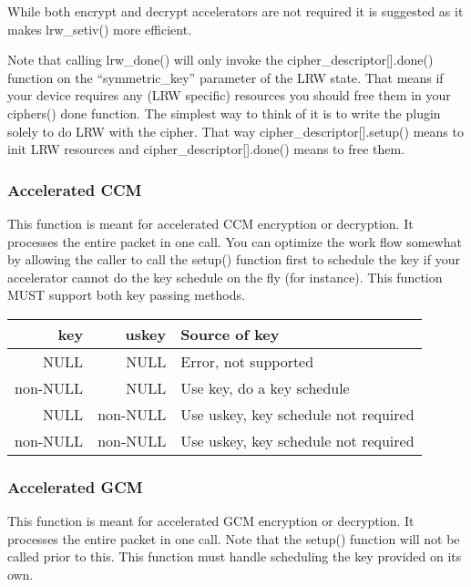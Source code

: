 \documentclass[a4paper]{book}
\begin{document}
While both encrypt and decrypt accelerators are not required it is suggested as it makes lrw\_setiv() more efficient.

Note that calling lrw\_done() will only invoke the cipher\_descriptor[].done() function on the ``symmetric\_key'' parameter of the LRW state.  That means 
if your device requires any (LRW specific) resources you should free them in your ciphers() done function.  The simplest way to think of it is to write
the plugin solely to do LRW with the cipher.  That way cipher\_descriptor[].setup() means to init LRW resources and cipher\_descriptor[].done() means to
free them.

\subsubsection{Accelerated CCM}
This function is meant for accelerated CCM encryption or decryption.  It processes the entire packet in one call.  You can optimize the work flow somewhat
by allowing the caller to call the setup() function first to schedule the key if your accelerator cannot do the key schedule on the fly (for instance).  This 
function MUST support both key passing methods.

\begin{center}
\begin{small}
\begin{tabular}{|r|r|l|}
\hline \textbf{key} & \textbf{uskey} & \textbf{Source of key} \\
\hline NULL         & NULL           & Error, not supported \\
\hline non-NULL     & NULL           & Use key, do a key schedule \\
\hline NULL         & non-NULL       & Use uskey, key schedule not required \\
\hline non-NULL     & non-NULL       & Use uskey, key schedule not required \\
\hline
\end{tabular}
\end{small}
\end{center}

\subsubsection{Accelerated GCM}
This function is meant for accelerated GCM encryption or decryption.  It processes the entire packet in one call.  Note that the setup() function will not
be called prior to this.  This function must handle scheduling the key provided on its own.
\end{document}
